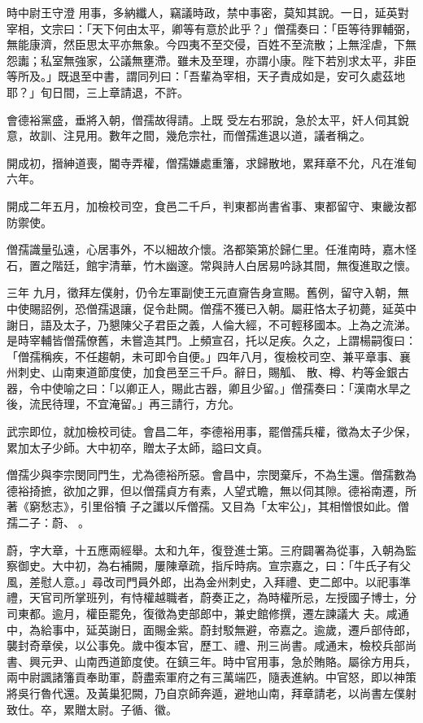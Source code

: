 \begin{pinyinscope}
 時中尉王守澄
 用事，多納纖人，竊議時政，禁中事密，莫知其說。一日，延英對宰相，文宗曰：「天下何由太平，卿等有意於此乎？」僧孺奏曰：「臣等待罪輔弼，無能康濟，然臣思太平亦無象。今四夷不至交侵，百姓不至流散；上無淫虐，下無怨讟；私室無強家，公議無壅滯。雖未及至理，亦謂小康。陛下若別求太平，非臣等所及。」既退至中書，謂同列曰：「吾輩為宰相，天子責成如是，安可久處茲地耶？」旬日間，三上章請退，不許。



 會德裕黨盛，垂將入朝，僧孺故得請。上既
 受左右邪說，急於太平，奸人伺其銳意，故訓、注見用。數年之間，幾危宗社，而僧孺進退以道，議者稱之。



 開成初，搢紳道喪，閽寺弄權，僧孺嫌處重籓，求歸散地，累拜章不允，凡在淮甸六年。



 開成二年五月，加檢校司空，食邑二千戶，判東都尚書省事、東都留守、東畿汝都防禦使。



 僧孺識量弘遠，心居事外，不以細故介懷。洛都築第於歸仁里。任淮南時，嘉木怪石，置之階廷，館宇清華，竹木幽邃。常與詩人白居易吟詠其間，無復進取之懷。



 三年
 九月，徵拜左僕射，仍令左軍副使王元直齎告身宣賜。舊例，留守入朝，無中使賜詔例，恐僧孺退讓，促令赴闕。僧孺不獲已入朝。屬莊恪太子初薨，延英中謝日，語及太子，乃懇陳父子君臣之義，人倫大經，不可輕移國本。上為之流涕。是時宰輔皆僧孺僚舊，未嘗造其門。上頻宣召，托以足疾。久之，上謂楊嗣復曰：「僧孺稱疾，不任趨朝，未可即令自便。」四年八月，復檢校司空、兼平章事、襄州刺史、山南東道節度使，加食邑至三千戶。辭日，賜觚、
 散、樽、杓等金銀古器，令中使喻之曰：「以卿正人，賜此古器，卿且少留。」僧孺奏曰：「漢南水旱之後，流民待理，不宜淹留。」再三請行，方允。



 武宗即位，就加檢校司徒。會昌二年，李德裕用事，罷僧孺兵權，徵為太子少保，累加太子少師。大中初卒，贈太子太師，謚曰文貞。



 僧孺少與李宗閔同門生，尤為德裕所惡。會昌中，宗閔棄斥，不為生還。僧孺數為德裕掎摭，欲加之罪，但以僧孺貞方有素，人望式瞻，無以伺其隙。德裕南遷，所著《窮愁志》，引里俗犢
 子之讖以斥僧孺。又目為「太牢公」，其相憎恨如此。僧孺二子：蔚、。



 蔚，字大章，十五應兩經舉。太和九年，復登進士第。三府闢署為從事，入朝為監察御史。大中初，為右補闕，屢陳章疏，指斥時病。宣宗嘉之，曰：「牛氏子有父風，差慰人意。」尋改司門員外郎，出為金州刺史，入拜禮、吏二郎中。以祀事準禮，天官司所掌班列，有恃權越職者，蔚奏正之，為時權所忌，左授國子博士，分司東都。逾月，權臣罷免，復徵為吏部郎中，兼史館修撰，遷左諫議大
 夫。咸通中，為給事中，延英謝日，面賜金紫。蔚封駁無避，帝嘉之。逾歲，遷戶部侍郎，襲封奇章侯，以公事免。歲中復本官，歷工、禮、刑三尚書。咸通末，檢校兵部尚書、興元尹、山南西道節度使。在鎮三年。時中官用事，急於賄賂。屬徐方用兵，兩中尉諷諸籓貢奉助軍，蔚盡索軍府之有三萬端匹，隨表進納。中官怒，即以神策將吳行魯代還。及黃巢犯闕，乃自京師奔遁，避地山南，拜章請老，以尚書左僕射致仕。卒，累贈太尉。子循、徽。




\end{pinyinscope}

